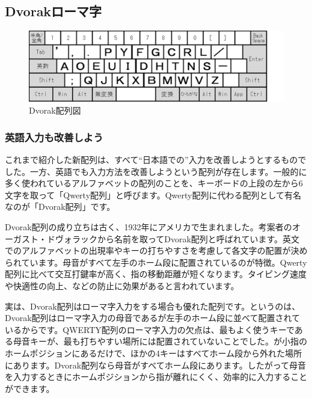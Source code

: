\subsection{Dvorakローマ字}


\begin{figure}
 \begin{center}
   \includegraphics[width=14cm,clip]{res_kouy/Dvorak.eps}
 \end{center}
 \caption{Dvorak配列図}
 \label{Dvorak}
\end{figure}

\subsubsection*{英語入力も改善しよう}

これまで紹介した新配列は、すべて“日本語での”入力を改善しようとするものでした。一方、英語でも入力方法を改善しようという配列が存在します。一般的に多く使われているアルファベットの配列のことを、キーボードの上段の左から6文字を取って「Qwerty配列」と呼びます。Qwerty配列に代わる配列として有名なのが「Dvorak配列」です。

Dvorak配列の成り立ちは古く、1932年にアメリカで生まれました。考案者のオーガスト・ドヴォラックから名前を取ってDvorak配列と呼ばれています。英文でのアルファベットの出現率やキーの打ちやすさを考慮して各文字の配置が決められています。母音がすべて左手のホーム段に配置されているのが特徴。Qwerty配列に比べて交互打鍵率が高く、指の移動距離が短くなります。タイピング速度や快適性の向上、などの防止に効果があると言われています。

実は、Dvorak配列はローマ字入力をする場合も優れた配列です。というのは、Dvorak配列はローマ字入力の母音であるが左手のホーム段に並べて配置されているからです。QWERTY配列のローマ字入力の欠点は、最もよく使うキーである母音キーが、最も打ちやすい場所には配置されていないことでした。が小指のホームポジションにあるだけで、ほかの4キーはすべてホーム段から外れた場所にあります。Dvorak配列なら母音がすべてホーム段にあります。したがって母音を入力するときにホームポジションから指が離れにくく、効率的に入力することができます。

